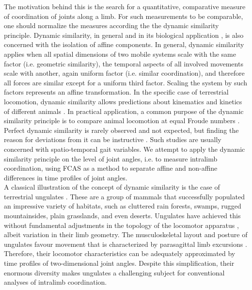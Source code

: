 The motivation behind this is the search for a quantitative, comparative measure of coordination of joints along a limb.
For such measurements to be comparable, one should normalize the measures according the the dynamic similarity principle.
Dynamic similarity, in general and in its biological application \cite[\textit{cf.}][]{Alexander1983,Vaughan2005}, is also concerned with the isolation of affine components.
In general, dynamic similarity applies when all spatial dimensions of two mobile systems scale with the same factor (i.e. geometric similarity), the temporal aspects of all involved movements scale with another, again uniform factor (i.e. similar coordination), and therefore all forces are similar except for a uniform third factor.
Scaling the system by such factors represents an affine transformation.
In the specific case of terrestrial locomotion, dynamic similarity allows predictions about kinematics and kinetics of different animals \cite[i.e. about leg phasing, relative stride length, duty factors, forces and power output;][]{Alexander1983}.
In practical application, a common purpose of the dynamic similarity principle is to compare animal locomotion at equal Froude numbers \cite[e.g.][]{SteudelNumbers2006,Holmes2006}.
Perfect dynamic similarity is rarely observed and not expected, but finding the reason for deviations from it can be instructive \cite[e.g.][]{SteudelNumbers2006,Raichlen2013,Kramer2013}.
Such studies are usually concerned with spatio-temporal gait variables.
We attempt to apply the dynamic similarity principle on the level of joint angles, i.e. to measure intralimb coordination, using FCAS as a method to separate affine and non-affine differences in time profiles of joint angles.
\\A classical illustration of the concept of dynamic similarity is the case of terrestrial ungulates \citep{Alexander1983}.
These are a group of mammals that successfully populated an impressive variety of habitats, such as cluttered rain forests, swamps, rugged mountainsides, plain grasslands, and even deserts.
Ungulates have achieved this without fundamental adjustments in the topology of the locomotor apparatus \citep{McMahon1975,Alexander1984}, albeit variation in their limb geometry.
The musculoskeletal layout and posture of ungulates favour movement that is characterized by parasagittal limb excursions \cite[][]{Jenkins1971,Stein1997}.
Therefore, their locomotor characteristics can be adequately approximated by time profiles of two-dimensional joint angles.
Despite this simplification, their enormous diversity makes ungulates a challenging subject for conventional analyses of intralimb coordination.
